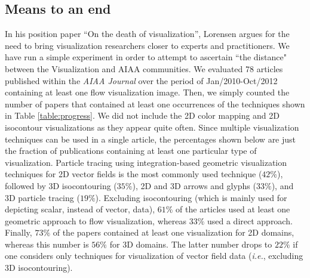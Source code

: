 \subsection{Means to an end}
In his position paper ``On the death of visualization''\cite{citeulike:4186603}, Lorensen argues for the need to bring visualization researchers closer to experts and practitioners. 
%
We have run a simple experiment in order to attempt to ascertain ``the distance" between the Visualization and AIAA communities.
%
We evaluated 78 articles published within the {\em AIAA Journal} over the period of Jan/2010-Oct/2012 containing at least one flow visualization image. 
%
Then, we simply counted the number of papers that contained at least one occurrences of the techniques shown in Table \ref{table:progress}. 
%
We did not include the 2D color mapping and 2D isocontour visualizations as they appear quite often. 
%
Since multiple visualization techniques can be used in a single article, the percentages shown below are just the fraction of publications containing at least one particular type of visualization.
%
Particle tracing using integration-based geometric visualization techniques for 2D vector fields is the most commonly used technique ($42\%$), followed by 3D isocontouring ($35\%$), 2D and 3D arrows and glyphs ($33\%$), and 3D particle tracing ($19\%$). 
% 
Excluding isocontouring (which is mainly used for depicting scalar, instead of vector, data), $61\%$ of the articles used at least one geometric approach to flow visualization, whereas $33\%$ used a direct approach. 
%
Finally, $73\%$ of the papers contained at least one visualization for 2D domains, whereas this number is $56\%$ for 3D domains. 
%
The latter number drops to $22\%$ if one considers only techniques for visualization of vector field data (\emph{i.e.}, excluding 3D isocontouring).

